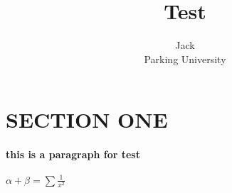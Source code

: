 \documentclass{article}
\author{Jack \\
		Parking University}
\title{Test}
\begin{document}
\maketitle
\section*{SECTION ONE}
\paragraph{this is a paragraph for test}
$\alpha + \beta = \sum \frac{1}{x^2}$
\end{document}
